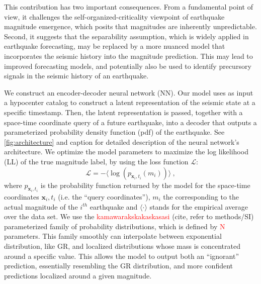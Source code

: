 \documentclass[pdflatex]{sn-jnl}
\newcommand{\yohai}[1]{{\textcolor{red}{#1}}}
\begin{document}
This contribution has two important consequences. From a fundamental point of view, it challenges the self-organized-criticality viewpoint of earthquake magnitude emergence, which posits that magnitudes are inherently unpredictable. Second, it suggests that the separability assumption, which is widely applied in earthquake forecasting, may be replaced by a more nuanced model that incorporates the seismic history into the magnitude prediction. This may lead to improved forecasting models, and potentially also be used to identify precursory signals in the seismic history of an earthquake.


We construct an encoder-decoder neural network (NN). Our model uses as input a hypocenter catalog to construct a latent representation of the seismic state at a specific timestamp. Then, the latent representation is passed, together with  a space-time coordinate query of a future earthquake, into a decoder that outputs a parameterized probability density function (pdf) of the earthquake. See \ref{fig:architecture} and caption for detailed description of the neural network's architecture. We optimize the model parameters to maximize the log likelihood (LL) of the true magnitude label, by using the loss function $\mathcal{L}$:
\begin{equation}
    \mathcal{L} = -\langle \log{ \left( p_{\textbf{x}_i, t_i} \left( m_i \right) \right) } \rangle\ ,
    \label{eq:loss_function}
\end{equation}
where $p_{\textbf{x}_i, t_i}$ is the probability function returned by the model for the space-time coordinates $\textbf{x}_i, t_i$ (i.e. the ``query coordinates''), $m_i$ the corresponding to the actual magnitude of the $i^{th}$ earthquake and $\langle \cdot\rangle$ stands for the empirical average over the data set. We use the \yohai{kamawarakskakaskasasi} (cite, refer to methods/SI) parameterized family of probability distributions, which is defined by \yohai{N} parameters. This family smoothly can interpolate between exponential distribution, like GR, and localized distributions whose mass is concentrated around a specific value. This allows the model to output both an ``ignorant'' prediction, essentially resembling the GR distribution, and more confident predictions localized around a given magnitude.
\end{document}
